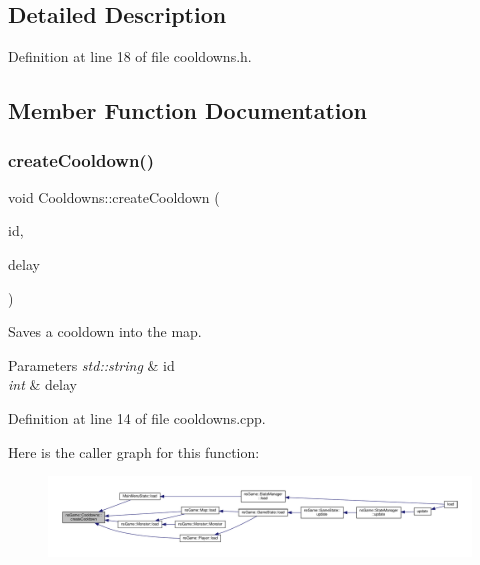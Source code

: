 \subsection{Detailed Description}


Definition at line 18 of file cooldowns.\+h.



\subsection{Member Function Documentation}
\mbox{\label{classns_game_1_1_cooldowns_a70e8df0692a58a08b31b2b6c9578265e}} 
\subsubsection{\texorpdfstring{create\+Cooldown()}{createCooldown()}}
{\footnotesize\ttfamily void Cooldowns\+::create\+Cooldown (\begin{DoxyParamCaption}\item[{std\+::string}]{id,  }\item[{unsigned}]{delay }\end{DoxyParamCaption})\hspace{0.3cm}{\ttfamily [static]}}



Saves a cooldown into the map. 


\begin{DoxyParams}{Parameters}
{\em std\+::string} & id \\
\hline
{\em int} & delay \\
\hline
\end{DoxyParams}


Definition at line 14 of file cooldowns.\+cpp.

Here is the caller graph for this function\+:\nopagebreak
\begin{figure}[H]
\begin{center}
\leavevmode
\includegraphics[width=350pt]{classns_game_1_1_cooldowns_a70e8df0692a58a08b31b2b6c9578265e_icgraph}
\end{center}
\end{figure}
\mbox{\label{classns_game_1_1_cooldowns_a423a58fcbbf7688556c5706249365f12}} 
